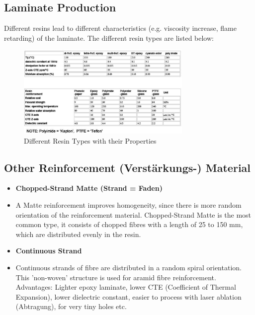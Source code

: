 	\subsection{Laminate Production}
	Different resins lead to different characteristics (e.g. viscosity increase, flame retarding) of the laminate. The different resin types are listed below: 
		\begin{figure}[h]
			\centering
			\includegraphics[width=0.75\textwidth]{images/ResinTypes.png}
			\caption{Different Resin Types with their Properties}
			\label{Fig:ResinTypes}
		\end{figure}
	\subsection{Other Reinforcement (Verstärkungs-) Material}
		\begin{itemize}
			\setlength{\itemsep}{0pt}
			\item \textbf{Chopped-Strand Matte (Strand = Faden)}
			\setlength{\itemsep}{-5pt}
			\item[] A Matte reinforcement improves homogeneity, since there is more random orientation of the reinforcement material. Chopped-Strand Matte is the most common type, it consists of chopped fibres with a length of 25 to 150 mm, which are distributed evenly in the resin. 
			\setlength{\itemsep}{0pt}
			\item \textbf{Continuous Strand}
			\setlength{\itemsep}{-5pt}
			\item[] Continuous strands of fibre are distributed in a random spiral orientation. This 'non-woven' structure is used for aramid fibre reinforcement. Advantages: Lighter epoxy laminate, lower CTE (Coefficient of Thermal Expansion), lower dielectric constant, easier to process with laser ablation (Abtragung), for very tiny holes etc. 
		\end{itemize}	

